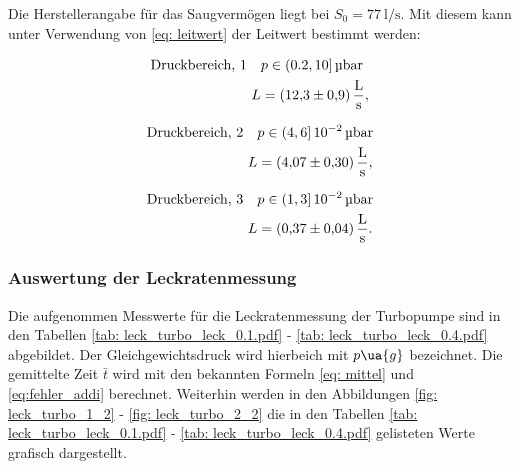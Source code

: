 Die Herstellerangabe für das Saugvermögen liegt bei $S_0=\SI{77}{\litre\per\second}$.
Mit diesem kann unter Verwendung von \eqref{eq: leitwert} der Leitwert bestimmt werden:

\begin{align}
  \label{eq:turbo_leit_1}
  \begin{aligned}
    \text{Druckbereich, 1} \quad  &p\in(0.2,10]\,\si{\micro\bar} \\
   L&=\SI{12.3\pm 0.9}{\litre\per\second},
\end{aligned}
\end{align}

\begin{align}
  \label{eq:turbo_leit_2}
  \begin{aligned}
    \text{Druckbereich, 2} \quad  &p\in(4,6]\,\num{e-2}\,\si{\micro\bar} \\
   L&=\SI{4.07\pm 0.30}{\litre\per\second},
\end{aligned}
\end{align}

\begin{align}
  \label{eq:turbo_leit_3}
  \begin{aligned}
    \text{Druckbereich, 3} \quad  &p\in(1,3]\,\num{e-2}\,\si{\micro\bar} \\
   L&=\SI{0.37\pm 0.04}{\litre\per\second}.
\end{aligned}
\end{align}

\subsubsection{Auswertung der Leckratenmessung}

Die aufgenommen Messwerte für die Leckratenmessung der Turbopumpe sind in den Tabellen \ref{tab: leck_turbo_leck_0.1.pdf} - \ref{tab: leck_turbo_leck_0.4.pdf} %
abgebildet. Der Gleichgewichtsdruck wird hierbeich mit $p\ua{g}$ bezeichnet. %
Die gemittelte Zeit $\bar{t}$ wird mit den bekannten Formeln \eqref{eq: mittel} und \eqref{eq:fehler_addi} berechnet.
Weiterhin werden in den Abbildungen \ref{fig: leck_turbo_1_2} - \ref{fig: leck_turbo_2_2} die in den Tabellen \ref{tab: leck_turbo_leck_0.1.pdf} - \ref{tab: leck_turbo_leck_0.4.pdf}
gelisteten Werte grafisch dargestellt.






